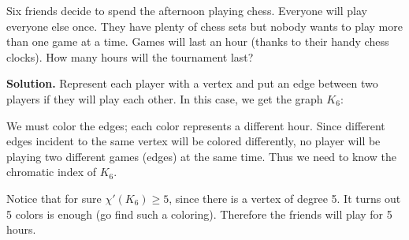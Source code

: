 \documentclass{book}
\begin{document}
\setcounter{project}{47}
\addtocounter{project}{-1}
\begin{activity}[]\label{activity-40}
\hypertarget{p-428}{}%
Six friends decide to spend the afternoon playing chess. Everyone will play everyone else once. They have plenty of chess sets but nobody wants to play more than one game at a time. Games will last an hour (thanks to their handy chess clocks). How many hours will the tournament last?%
\par\smallskip%
\noindent\textbf{Solution.}\hypertarget{solution-46}{}\quad%
\hypertarget{p-429}{}%
Represent each player with a vertex and put an edge between two players if they will play each other. In this case, we get the graph \(K_6\):%
\begin{sidebyside}{1}{0.4}{0.4}{0}
\begin{sbspanel}{0.2}
\end{sbspanel}
\end{sidebyside}
\par
\hypertarget{p-430}{}%
We must color the edges; each color represents a different hour. Since different edges incident to the same vertex will be colored differently, no player will be playing two different games (edges) at the same time. Thus we need to know the chromatic index of \(K_6\).%
\par
\hypertarget{p-431}{}%
Notice that for sure \(\chi'(K_6) \ge 5\), since there is a vertex of degree 5. It turns out 5 colors is enough (go find such a coloring). Therefore the friends will play for 5 hours.%
\end{activity}
\end{document}
